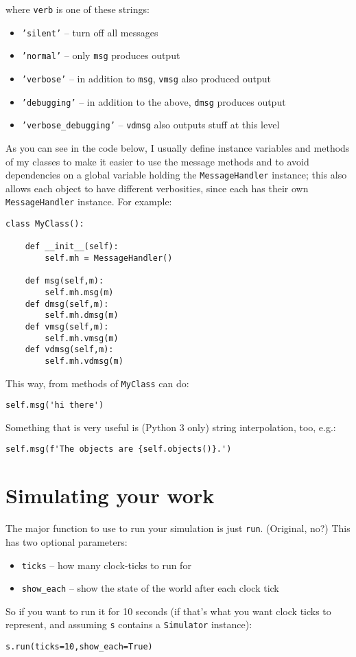 \documentclass[11pt]{tufte-handout}
\begin{document}
\noindent where \texttt{verb} is one of these strings:
\begin{itemize}
\item \texttt{'silent'} -- turn off all messages
\item \texttt{'normal'} -- only \texttt{msg} produces output
\item \texttt{'verbose'}  -- in addition to \texttt{msg}, \texttt{vmsg} also produced output
\item \texttt{'debugging'} -- in addition to the above, \texttt{dmsg} produces output
\item \texttt{'verbose\_debugging'} -- \texttt{vdmsg} also outputs stuff at this level
\end{itemize}

As you can see in the code below, I usually define instance variables and methods of my classes to make it easier to use the message methods and to avoid dependencies on a global variable holding the \texttt{MessageHandler} instance; this also allows each object to have different verbosities, since each has their own \texttt{MessageHandler} instance.  For example:
\begin{verbatim}
class MyClass():
    
    def __init__(self):
        self.mh = MessageHandler()

    def msg(self,m):
        self.mh.msg(m)
    def dmsg(self,m):
        self.mh.dmsg(m)
    def vmsg(self,m):
        self.mh.vmsg(m)
    def vdmsg(self,m):
        self.mh.vdmsg(m)
\end{verbatim}

This way, from methods of \texttt{MyClass} can do:
\begin{verbatim}
self.msg('hi there')
\end{verbatim}


Something that is very useful is (Python 3 only) string interpolation, too, e.g.:
\begin{verbatim}
self.msg(f'The objects are {self.objects()}.')
\end{verbatim}


\section{Simulating your work}
\label{sec:org87b7265}

The major function to use to run your simulation is just \texttt{run}.  (Original, no?)  This has two optional parameters:
\begin{itemize}
\item \texttt{ticks} -- how many clock-ticks to run for
\item \texttt{show\_each} -- show the state of the world after each clock tick
\end{itemize}
So if you want to run it for 10 seconds (if that's what you want  clock ticks to represent, and assuming \texttt{s} contains a \texttt{Simulator} instance):
\begin{verbatim}
s.run(ticks=10,show_each=True)
\end{verbatim}
\end{document}
